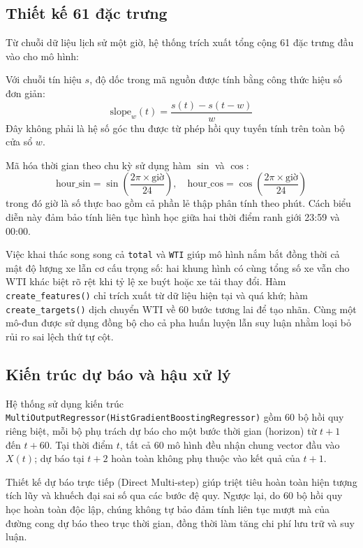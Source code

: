     \subsection{Thiết kế 61 đặc trưng}
    Từ chuỗi dữ liệu lịch sử một giờ, hệ thống trích xuất tổng cộng 61 đặc trưng đầu vào cho mô hình:

    

    Với chuỗi tín hiệu $s$, độ dốc trong mã nguồn được tính bằng công thức hiệu số đơn giản:
    \[
    \text{slope}_w(t) = \frac{s(t) - s(t-w)}{w}
    \]
    Đây không phải là hệ số góc thu được từ phép hồi quy tuyến tính trên toàn bộ cửa sổ $w$. 

    Mã hóa thời gian theo chu kỳ sử dụng hàm $\sin$ và $\cos$:
    \[
    \text{hour\_sin} = \sin\left(\frac{2\pi \times \text{giờ}}{24}\right), \quad \text{hour\_cos} = \cos\left(\frac{2\pi \times \text{giờ}}{24}\right)
    \]
    trong đó giờ là số thực bao gồm cả phần lẻ thập phân tính theo phút. Cách biểu diễn này đảm bảo tính liên tục hình học giữa hai thời điểm ranh giới 23:59 và 00:00.

    Việc khai thác song song cả \texttt{total} và \texttt{WTI} giúp mô hình nắm bắt đồng thời cả mật độ lượng xe lẫn cơ cấu trọng số: hai khung hình có cùng tổng số xe vẫn cho WTI khác biệt rõ rệt khi tỷ lệ xe buýt hoặc xe tải thay đổi. Hàm \texttt{create\_features()} chỉ trích xuất từ dữ liệu hiện tại và quá khứ; hàm \texttt{create\_targets()} dịch chuyển WTI về 60 bước tương lai để tạo nhãn. Cùng một mô-đun được sử dụng đồng bộ cho cả pha huấn luyện lẫn suy luận nhằm loại bỏ rủi ro sai lệch thứ tự cột.

    \subsection{Kiến trúc dự báo và hậu xử lý}
    Hệ thống sử dụng kiến trúc \texttt{MultiOutputRegressor(HistGradientBoostingRegressor)} gồm 60 bộ hồi quy riêng biệt, mỗi bộ phụ trách dự báo cho một bước thời gian (horizon) từ $t+1$ đến $t+60$. Tại thời điểm $t$, tất cả 60 mô hình đều nhận chung vector đầu vào $X(t)$; dự báo tại $t+2$ hoàn toàn không phụ thuộc vào kết quả của $t+1$.

    Thiết kế dự báo trực tiếp (Direct Multi-step) giúp triệt tiêu hoàn toàn hiện tượng tích lũy và khuếch đại sai số qua các bước đệ quy. Ngược lại, do 60 bộ hồi quy học hoàn toàn độc lập, chúng không tự bảo đảm tính liên tục mượt mà của đường cong dự báo theo trục thời gian, đồng thời làm tăng chi phí lưu trữ và suy luận.

